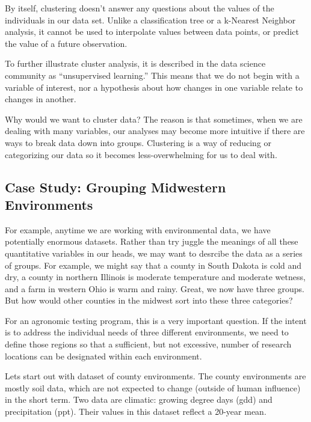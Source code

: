 \documentclass[
]{book}
\begin{document}
By itself, clustering doesn't answer any questions about the values of the individuals in our data set. Unlike a classification tree or a k-Nearest Neighbor analysis, it cannot be used to interpolate values between data points, or predict the value of a future observation.

To further illustrate cluster analysis, it is described in the data science community as ``unsupervised learning.'' This means that we do not begin with a variable of interest, nor a hypothesis about how changes in one variable relate to changes in another.

Why would we want to cluster data? The reason is that sometimes, when we are dealing with many variables, our analyses may become more intuitive if there are ways to break data down into groups. Clustering is a way of reducing or categorizing our data so it becomes less-overwhelming for us to deal with.

\hypertarget{case-study-grouping-midwestern-environments}{%
\subsection{Case Study: Grouping Midwestern Environments}\label{case-study-grouping-midwestern-environments}}

For example, anytime we are working with environmental data, we have potentially enormous datasets. Rather than try juggle the meanings of all these quantitative variables in our heads, we may want to desrcibe the data as a series of groups. For example, we might say that a county in South Dakota is cold and dry, a county in northern Illinois is moderate temperature and moderate wetness, and a farm in western Ohio is warm and rainy. Great, we now have three groups. But how would other counties in the midwest sort into these three categories?

For an agronomic testing program, this is a very important question. If the intent is to address the individual needs of three different environments, we need to define those regions so that a sufficient, but not excessive, number of research locations can be designated within each environment.

Lets start out with dataset of county environments. The county environments are mostly soil data, which are not expected to change (outside of human influence) in the short term. Two data are climatic: growing degree days (gdd) and precipitation (ppt). Their values in this dataset reflect a 20-year mean.
\end{document}
